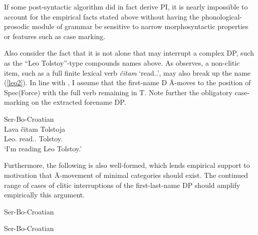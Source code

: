 \documentclass[output=paper]{langsci/langscibook}
\begin{document}
If some post-syntactic algorithm did in fact derive \gls{PI}, it is nearly
impossible to account for the empirical facts stated above without having the
phonological-prosodic module of grammar be sensitive to narrow morphosyntactic
properties or features such as case marking.

Also consider the fact that it is not  alone that may interrupt a
complex DP, such as the \enquote{Leo Tolstoy}-type compounds names above. As
\citet{Boskovic:2009b} observes, a non-clitic item, such as a full finite
lexical verb \emph{čitam} `read.\Fsg.\Prs{}', may also break up the name
(\ref{leo2}). In line with \citet{roberts:2012uq}, I assume that the first-name
D Ā-moves to the position of Spec(Force) with the full verb
remaining in T. Note further the obligatory case-marking on the
extracted forename DP.

\begin{exe}
    \ex Ser-Bo-Croatian\\
    \gll Lava čitam Tolstoja \\
    Leo.\Acc{} read.\Fsg.\Prs{} Tolstoy.\Acc{} \\
    \trans `I'm reading Leo Tolstoy.'
\label{leo2}
\end{exe}

Furthermore, the following is also well-formed, which lends empirical support
to  motivation that Ā-movement of minimal categories
should exist. The continued range of cases of clitic interruptions of the
first-last-name DP should amplify empirically this argument.

\begin{exe}
    \ex Ser-Bo-Croatian
\begin{xlista}
\end{xlista}
\label{6}
\ex Ser-Bo-Croatian
\begin{xlista}
\end{xlista}

\end{exe}
\end{document}
